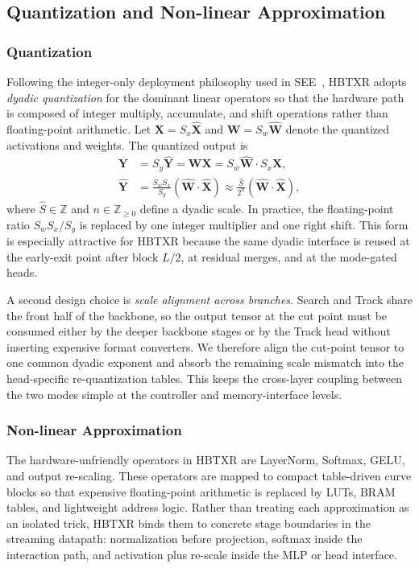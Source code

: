 \documentclass[journal]{IEEEtran}
\begin{document}
\subsection{Quantization and Non-linear Approximation}

\subsubsection{Quantization}
Following the integer-only deployment philosophy used in SEE~\cite{ref9}, HBTXR adopts \emph{dyadic quantization} for the dominant linear operators so that the hardware path is composed of integer multiply, accumulate, and shift operations rather than floating-point arithmetic. Let $\mathbf X=S_x\hat{\mathbf X}$ and $\mathbf W=S_w\hat{\mathbf W}$ denote the quantized activations and weights. The quantized output is
\begin{align}
\mathbf Y &= S_y\hat{\mathbf Y} = \mathbf W\mathbf X
          = S_w\hat{\mathbf W}\cdot S_x\hat{\mathbf X},\\
\hat{\mathbf Y}
&= \frac{S_wS_x}{S_y}\left(\hat{\mathbf W}\cdot\hat{\mathbf X}\right)
 \approx \frac{\hat S}{2^n}
 \left(\hat{\mathbf W}\cdot\hat{\mathbf X}\right),
\end{align}
where $\hat S \in \mathbb Z$ and $n\in \mathbb Z_{\ge 0}$ define a dyadic scale. In practice, the floating-point ratio $S_wS_x/S_y$ is replaced by one integer multiplier and one right shift. This form is especially attractive for HBTXR because the same dyadic interface is reused at the early-exit point after block $L/2$, at residual merges, and at the mode-gated heads.

A second design choice is \emph{scale alignment across branches}. Search and Track share the front half of the backbone, so the output tensor at the cut point must be consumed either by the deeper backbone stages or by the Track head without inserting expensive format converters. We therefore align the cut-point tensor to one common dyadic exponent and absorb the remaining scale mismatch into the head-specific re-quantization tables. This keeps the cross-layer coupling between the two modes simple at the controller and memory-interface levels.


\subsubsection{Non-linear Approximation}
The hardware-unfriendly operators in HBTXR are LayerNorm, Softmax, GELU, and output re-scaling. These operators are mapped to compact table-driven curve blocks so that expensive floating-point arithmetic is replaced by LUTs, BRAM tables, and lightweight address logic. Rather than treating each approximation as an isolated trick, HBTXR binds them to concrete stage boundaries in the streaming datapath: normalization before projection, softmax inside the interaction path, and activation plus re-scale inside the MLP or head interface.
\end{document}
